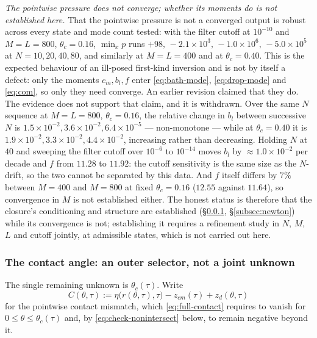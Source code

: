 \emph{The pointwise pressure does not converge; whether its moments do is not established here.} That the pointwise pressure is not a converged output is robust across every state and mode count tested: with the filter cutoff at $10^{-10}$ and $M=L=800$, $\theta_c=0.16$, $\min_xp$ runs $+98,\,-2.1\times10^3,\,-1.0\times10^6,\,-5.0\times10^5$ at $N=10,20,40,80$, and similarly at $M=L=400$ and at $\theta_c=0.40$. This is the expected behaviour of an ill-posed first-kind inversion and is not by itself a defect: only the moments $c_m,b_l,f$ enter \eqref{eq:bath-mode}, \eqref{eq:drop-mode} and \eqref{eq:com}, so only they need converge. An earlier revision claimed that they do. The evidence does not support that claim, and it is withdrawn. Over the same $N$ sequence at $M=L=800$, $\theta_c=0.16$, the relative change in $b_l$ between successive $N$ is $1.5\times10^{-2},3.6\times10^{-2},6.4\times10^{-5}$ --- non-monotone --- while at $\theta_c=0.40$ it is $1.9\times10^{-2},3.3\times10^{-2},4.4\times10^{-2}$, increasing rather than decreasing. Holding $N$ at $40$ and sweeping the filter cutoff over $10^{-6}$ to $10^{-14}$ moves $b_l$ by $\approx1.0\times10^{-2}$ per decade and $f$ from $11.28$ to $11.92$: the cutoff sensitivity is the same size as the $N$-drift, so the two cannot be separated by this data. And $f$ itself differs by $7\%$ between $M=400$ and $M=800$ at fixed $\theta_c=0.16$ ($12.55$ against $11.64$), so convergence in $M$ is not established either. The honest status is therefore that the closure's conditioning and structure are established (\S\ref{subsubsec:contact-angle}, \S\ref{subsec:newton}) while its convergence is not; establishing it requires a refinement study in $N$, $M$, $L$ and cutoff jointly, at admissible states, which is not carried out here.

\subsubsection{The contact angle: an outer selector, not a joint unknown}
\label{subsubsec:contact-angle}

\hspace*{1em}The single remaining unknown is $\theta_c(\tau)$. Write
\begin{equation}
    C(\theta,\tau) := \eta\big(r(\theta,\tau),\tau\big)-z_{cm}(\tau)+z_d(\theta,\tau)
    \label{eq:pointwise-residual-sec3}
\end{equation}
for the pointwise contact mismatch, which \eqref{eq:full-contact} requires to vanish for $0\le\theta\le\theta_c(\tau)$ and, by \eqref{eq:check-nonintersect} below, to remain negative beyond it.

